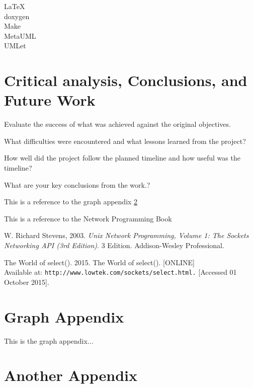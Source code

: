 \documentclass[12pt,a4paper,titlepage]{article}
\begin{document}
LaTeX\\
doxygen\\
Make\\
MetaUML\\
UMLet\\

\section{Critical analysis, Conclusions, and Future Work}

Evaluate the success of what was achieved against the original objectives. 

What difficulties were encountered and what lessons learned from the project? 

How well did the project follow the planned timeline and how useful was the timeline?  

What are your key conclusions from the work.?

This is a reference to the graph appendix \ref{appendix:graph}

This is a reference to the Network Programming Book \cite[p.~215]{stevensunp}

\newpage

\begin{thebibliography}{99}

W. Richard Stevens, 2003. \textit{Unix Network Programming, Volume 1: The Sockets Networking API (3rd Edition)}. 3 Edition. Addison-Wesley Professional.

The World of select(). 2015. The World of select(). [ONLINE] \\
Available at: \texttt{http://www.lowtek.com/sockets/select.html.} [Accessed 01 October 2015].

\end{thebibliography}

\newpage
\begin{appendices}

\section{Graph Appendix}
\label{appendix:graph}
This is the graph appendix...

\section{Another Appendix}

\end{appendices}
\end{document}
